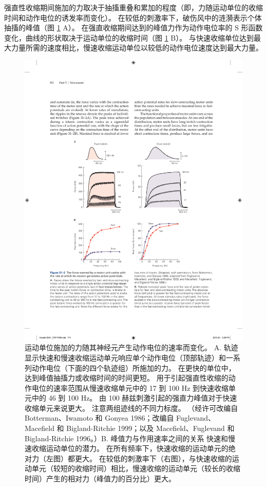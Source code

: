 强直性收缩期间施加的力取决于抽搐重叠和累加的程度（即，力随运动单位的收缩时间和动作电位的诱发率而变化）。 
在较低的刺激率下，破伤风中的涟漪表示个体抽搐的峰值（图 \ref{fig:31_2} A）。 
在强直收缩期间达到的峰值力作为动作电位率的 S 形函数变化，曲线的形状取决于运动单位的收缩时间（图 \ref{fig:31_2} B）。 与快速收缩单位达到最大力量所需的速度相比，慢速收缩运动单位以较低的动作电位速度达到最大力量。

\begin{figure}[htbp]
	\centering
	\includegraphics[width=0.7\linewidth]{chap31/fig_31_2}
	\caption{运动单位施加的力随其神经元产生动作电位的速率而变化。 A. 轨迹显示快速和慢速收缩运动单元响应单个动作电位（顶部轨迹）和一系列动作电位（下面的四个轨迹组）所施加的力。 在更快的单位中，达到峰值抽搐力或收缩时间的时间更短。 用于引起强直性收缩的动作电位的速率范围从慢速收缩单元中的 17 到 100 Hz 到快速收缩单元中的 46 到 100 Hz。 由 100 赫兹刺激引起的强直力峰值对于快速收缩单元来说更大。 注意两组迹线的不同力标度。 （经许可改编自 Botterman、Iwamoto 和 Gonyea 1986；改编自 Fuglevand、Macefield 和 Bigland-Ritchie 1999；以及 Macefield、Fuglevand 和 Bigland-Ritchie 1996。）B. 峰值力与作用速率之间的关系 快速和慢速收缩运动单位的潜力。 在所有频率下，快速收缩的运动单元的绝对力（左图）都更大。 在较低的刺激率下（右图），与快速收缩的运动单元（较短的收缩时间）相比，慢速收缩的运动单元（较长的收缩时间）产生的相对力（峰值力的百分比）更大。}
	\label{fig:31_2}
\end{figure}



